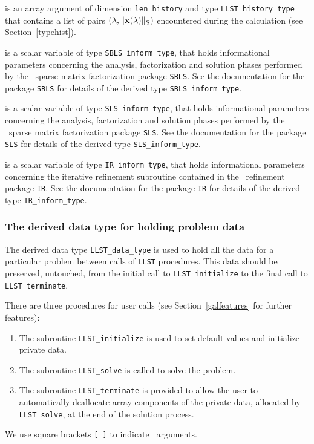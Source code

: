 \documentclass{galahad}
\newcommand{\packagename}{LLST}
\begin{document}
\begin{description}
 is an array argument of dimension {\tt len\_history} and  
type {\tt \packagename\_history\_type} that contains a list of pairs
$(\lambda,\|{\mathbf{x}}(\lambda)\|_{{\mathbf{S}}})$ encountered during the
calculation (see Section~\ref{typehist}).

 is a scalar variable of type {\tt SBLS\_inform\_type}, 
that holds informational parameters concerning the analysis, factorization
and solution phases performed by 
the \galahad\ sparse matrix factorization package {\tt SBLS}. 
See the documentation for the package {\tt SBLS} for details of the
derived type {\tt SBLS\_inform\_type}.

 is a scalar variable of type {\tt SLS\_inform\_type}, 
that holds informational parameters concerning the analysis, factorization
and solution phases performed by 
the \galahad\ sparse matrix factorization package {\tt SLS}. 
See the documentation for the package {\tt SLS} for details of the
derived type {\tt SLS\_inform\_type}.

 is a scalar variable of type {\tt IR\_inform\_type}, 
that holds informational parameters concerning the iterative refinement 
subroutine contained in the \galahad\ refinement package {\tt IR}. 
See the documentation for the package {\tt IR} for details of the
derived type {\tt IR\_inform\_type}.


\end{description}


\subsubsection{The derived data type for holding problem data}\label{typedata}
The derived data type 
{\tt \packagename\_data\_type} 
is used to hold all the data for a particular problem between calls of 
{\tt \packagename} procedures. 
This data should be preserved, untouched, from the initial call to 
{\tt \packagename\_initialize}
to the final call to
{\tt \packagename\_terminate}.


\galarguments
There are three procedures for user calls
(see Section~\ref{galfeatures} for further features): 

\begin{enumerate}
\item The subroutine 
      {\tt \packagename\_initialize} 
      is used to set default values and initialize private data.
\item The subroutine 
      {\tt \packagename\_solve} 
      is called to solve the problem. 
\item The subroutine 
      {\tt \packagename\_terminate} 
      is provided to allow the user to automatically deallocate array 
       components of the private data, allocated by 
       {\tt \packagename\_solve}, 
       at the end of the solution process. 
\end{enumerate}
We use square brackets {\tt [ ]} to indicate \optional\ arguments.
\end{document}
